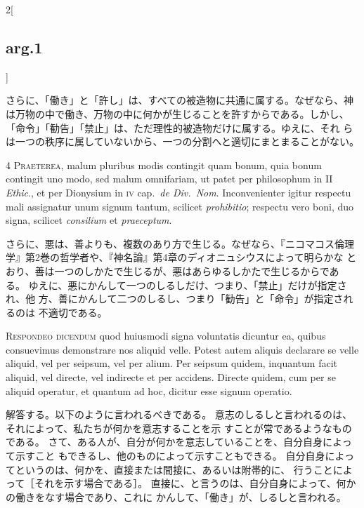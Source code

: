 \documentclass[paper=a4paper,fontsize=10pt,jafontsize=9pt,titlepage]{jlreq}
\begin{document}
\begin{paracol}{2}[\subsection{arg.1}]
\switchcolumn

さらに、「働き」と「許し」は、すべての被造物に共通に属する。なぜなら、神
 は万物の中で働き、万物の中に何かが生じることを許すからである。しかし、
 「命令」「勧告」「禁止」は、ただ理性的被造物だけに属する。ゆえに、それ
 らは一つの秩序に属していないから、一つの分割へと適切にまとまることがない。



{\scshape 4 Praeterea}, malum pluribus modis contingit
quam bonum, quia bonum contingit uno modo, sed malum omnifariam, ut
patet per philosophum in II {\itshape Ethic}., et per Dionysium in {\scshape iv} cap.~{\itshape de
Div.~Nom}. Inconvenienter igitur respectu mali assignatur unum signum
tantum, scilicet {\itshape prohibitio}; respectu vero boni, duo signa, scilicet
{\itshape consilium} et {\itshape praeceptum}.

\switchcolumn

さらに、悪は、善よりも、複数のあり方で生じる。なぜなら、『ニコマコス倫理
 学』第2巻の哲学者や、『神名論』第4章のディオニュシウスによって明らかな
 とおり、善は一つのしかたで生じるが、悪はあらゆるしかたで生じるからであ
 る。
ゆえに、悪にかんして一つのしるしだけ、つまり、「禁止」だけが指定され、他
 方、善にかんして二つのしるし、つまり「勧告」と「命令」が指定されるのは
 不適切である。



{\scshape Respondeo dicendum} quod huiusmodi signa
voluntatis dicuntur ea, quibus consuevimus demonstrare nos aliquid
velle. Potest autem aliquis declarare se velle aliquid, vel per seipsum,
vel per alium. Per seipsum quidem, inquantum facit aliquid, vel directe,
vel indirecte et per accidens. Directe quidem, cum per se aliquid
operatur, et quantum ad hoc, dicitur esse signum operatio.

\switchcolumn

解答する。以下のように言われるべきである。
意志のしるしと言われるのは、それによって、私たちが何かを意志することを示
 すことが常であるようなものである。
さて、ある人が、自分が何かを意志していることを、自分自身によって示すこと
 もできるし、他のものによって示すこともできる。
自分自身によってというのは、何かを、直接または間接に、あるいは附帯的に、
 行うことによって［それを示す場合である］。
直接に、と言うのは、自分自身によって、何かの働きをなす場合であり、これに
 かんして、「働き」が、しるしと言われる。


\end{paracol}
\end{document}

